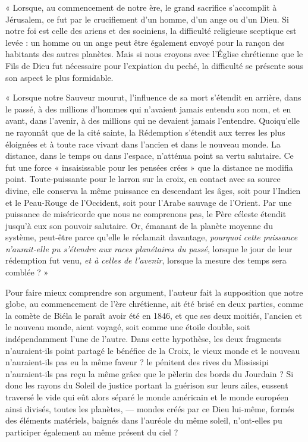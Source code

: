 \documentclass[a4paper, 11pt, oneside, landscape]{article}
\begin{document}
« Lorsque, au commencement de notre ère, le grand sacrifice s'accomplit à Jérusalem, ce fut par le crucifiement d'un homme, d'un ange ou d'un Dieu. Si notre foi est celle des ariens et des sociniens, la difficulté religieuse sceptique est levée : un homme ou un ange peut être également envoyé pour la rançon des habitants des autres planètes. Mais si nous croyons avec l'Église chrétienne que le Fils de Dieu fut nécessaire pour l'expiation du peché, la difficulté se présente sous son aspect le plus formidable.

« Lorsque notre Sauveur mourut, l'influence de sa mort s'étendit en arrière, dans le passé, à des millions d'hommes qui n'avaient jamais entendu son nom, et en avant, dans l'avenir, à des millions qui ne devaient jamais l'entendre. Quoiqu'elle ne rayonnât que de la cité sainte, la Rédemption s'étendit aux terres les plus éloignées et à toute race vivant dans l'ancien et dans le nouveau monde. La distance, dans le temps ou dans l'espace, n'atténua point sa vertu salutaire. Ce fut une force « insaisissable pour les pensées crées » que la distance ne modifia point. Toute-puissante pour le larron sur la croix, en contact avec sa source divine, elle conserva la même puissance en descendant les âges, soit pour l'Indien et le Peau-Rouge de l'Occident, soit pour l'Arabe sauvage de l'Orient. Par une puissance de miséricorde que nous ne comprenons pas, le Père céleste étendit jusqu'à eux son pouvoir salutaire. Or, émanant de la planète moyenne du système, peut-être parce qu'elle le réclamait davantage, \emph{pourquoi cette puissance n'aurait-elle pu s'étendre aux races planétaires du passé}, lorsque le jour de leur rédemption fut venu, \emph{et à celles de l'avenir}, lorsque la mesure des temps sera comblée ? »

Pour faire mieux comprendre son argument, l'auteur fait la supposition que notre globe, au commencement de l'ère chrétienne, ait été brisé en deux parties, comme la comète de Biéla le paraît avoir été en 1846, et que ses deux moitiés, l'ancien et le nouveau monde, aient voyagé, soit comme une étoile double, soit indépendamment l'une de l'autre. Dans cette hypothèse, les deux fragments n'auraient-ils point partagé le bénéfice de la Croix, le vieux monde et le nouveau n'auraient-ils pas eu la même faveur ? le pénitent des rives du Mississipi n'auraient-ils pas reçu la même grâce que le pèlerin des bords du Jourdain ? Si donc les rayons du Soleil de justice portant la guérison sur leurs ailes, eussent traversé le vide qui eût alors séparé le monde américain et le monde européen ainsi divisés, toutes les planètes, --- mondes créés par ce Dieu lui-même, formés des éléments matériels, baignés dans l'auréole du même soleil, n'ont-elles pu participer également au même présent du ciel ?
\end{document}
